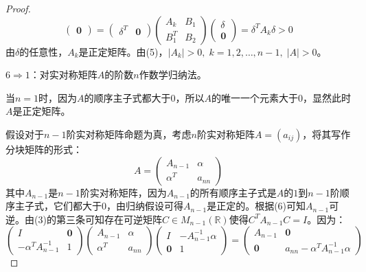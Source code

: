 \begin{proof}
\begin{equation*}
\begin{pmatrix}
			\mathbf{0}
		\end{pmatrix}
		=
		\begin{pmatrix}
			\delta^T & \mathbf{0}
		\end{pmatrix}
		\begin{pmatrix}
			A_k & B_1 \\
			B_1^T & B_2
		\end{pmatrix}
		\begin{pmatrix}
			\delta \\
			\mathbf{0}
		\end{pmatrix}
		=\delta^TA_k\delta>0
	\end{equation*}
	由$\delta$的任意性，$A_k$是正定矩阵。由(5)，$|A_k|>0,\;k=1,2,\dots,n-1,\;|A|>0$。\par
	$6\Rightarrow1$：对实对称矩阵$A$的阶数$n$作数学归纳法。\par
	当$n=1$时，因为$A$的顺序主子式都大于$0$，所以$A$的唯一一个元素大于$0$，显然此时$A$是正定矩阵。\par
	假设对于$n-1$阶实对称矩阵命题为真，考虑$n$阶实对称矩阵$A=(a_{ij})$，将其写作分块矩阵的形式：
	\begin{equation*}
		A=
		\begin{pmatrix}
			A_{n-1} & \alpha \\
			\alpha^T & a_{nn}
		\end{pmatrix}
	\end{equation*}
	其中$A_{n-1}$是$n-1$阶实对称矩阵，因为$A_{n-1}$的所有顺序主子式是$A$的$1$到$n-1$阶顺序主子式，它们都大于$0$，由归纳假设可得$A_{n-1}$是正定的。根据(6)可知$A_{n-1}$可逆。由(3)的第三条可知存在可逆矩阵$C\in M_{n-1}(\mathbb{R})$使得$C^TA_{n-1}C=I$。因为：
	\begin{equation*}
		\begin{pmatrix}
			I & \mathbf{0} \\
			-\alpha^TA_{n-1}^{-1} & 1
		\end{pmatrix}
		\begin{pmatrix}
			A_{n-1} & \alpha \\
			\alpha^T & a_{nn}
		\end{pmatrix}
		\begin{pmatrix}
			I & -A_{n-1}^{-1}\alpha \\
			\mathbf{0} & 1
		\end{pmatrix}
		=
		\begin{pmatrix}
			A_{n-1} & \mathbf{0} \\
			\mathbf{0} & a_{nn}-\alpha^TA_{n-1}^{-1}\alpha
		\end{pmatrix}
	\end{equation*}

\end{proof}
